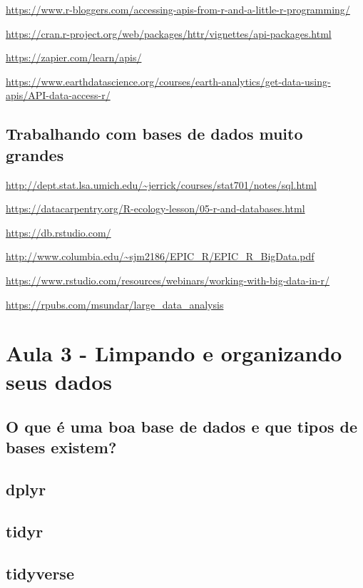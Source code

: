 \documentclass[12pt,a4paper,oneside]{erdc}\usepackage[]{graphicx}\usepackage[]{color}
\begin{document}
\url{https://www.r-bloggers.com/accessing-apis-from-r-and-a-little-r-programming/}

\url{https://cran.r-project.org/web/packages/httr/vignettes/api-packages.html}

\url{https://zapier.com/learn/apis/}

\url{https://www.earthdatascience.org/courses/earth-analytics/get-data-using-apis/API-data-access-r/}



\section{Trabalhando com bases de dados muito grandes}

\url{http://dept.stat.lsa.umich.edu/~jerrick/courses/stat701/notes/sql.html}

\url{https://datacarpentry.org/R-ecology-lesson/05-r-and-databases.html}

\url{https://db.rstudio.com/}

\url{http://www.columbia.edu/~sjm2186/EPIC_R/EPIC_R_BigData.pdf}

\url{https://www.rstudio.com/resources/webinars/working-with-big-data-in-r/}

\url{https://rpubs.com/msundar/large_data_analysis}



\chapter{Aula 3 - Limpando e organizando seus dados}

	\section{O que é uma boa base de dados e que tipos de bases existem?}
	
	\section{dplyr}
	
	\section{tidyr}
	
	\section{tidyverse}
\end{document}
